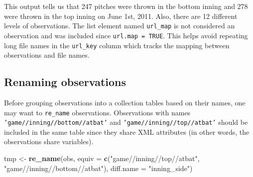 \documentclass[12pt,]{isuthesis}
\newenvironment{Shaded}{\begin{snugshade}}{\end{snugshade}}
\newcommand{\KeywordTok}[1]{\textcolor[rgb]{0.13,0.29,0.53}{\textbf{{#1}}}}
\newcommand{\DataTypeTok}[1]{\textcolor[rgb]{0.13,0.29,0.53}{{#1}}}
\newcommand{\DecValTok}[1]{\textcolor[rgb]{0.00,0.00,0.81}{{#1}}}
\newcommand{\StringTok}[1]{\textcolor[rgb]{0.31,0.60,0.02}{{#1}}}
\newcommand{\CommentTok}[1]{\textcolor[rgb]{0.56,0.35,0.01}{\textit{{#1}}}}
\newcommand{\NormalTok}[1]{{#1}}
\begin{document}
This output tells us that 247 pitches were thrown in the bottom inning
and 278 were thrown in the top inning on June 1st, 2011. Also, there are
12 different levels of observations. The list element named
\texttt{url\_map} is not considered an observation and was included
since \texttt{url.map = TRUE}. This helps avoid repeating long file
names in the \texttt{url\_key} column which tracks the mapping between
observations and file names.

\begin{Shaded}
\end{Shaded}

\subsection{Renaming observations}\label{renaming-observations}

Before grouping observations into a collection tables based on their
names, one may want to \texttt{re\_name} observations. Observations with
names \texttt{'game//inning//bottom//atbat'} and
\texttt{'game//inning//top//atbat'} should be included in the same table
since they share XML attributes (in other words, the observations share
variables).

\begin{Shaded}
\begin{Highlighting}[]
\NormalTok{tmp <-}\StringTok{ }\KeywordTok{re_name}\NormalTok{(obs, }\DataTypeTok{equiv =} \KeywordTok{c}\NormalTok{(}\StringTok{"game//inning//top//atbat"}\NormalTok{,                             }
  \StringTok{"game//inning//bottom//atbat"}\NormalTok{), }\DataTypeTok{diff.name =} \StringTok{"inning_side"}\NormalTok{) }
\end{Highlighting}
\end{Shaded}
\end{document}
